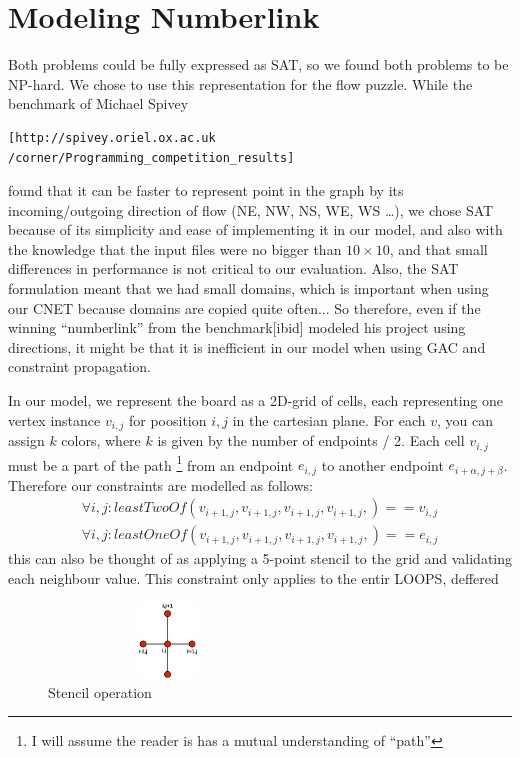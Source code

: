 \documentclass[journal]{IEEEtran}
\begin{document}
\section*{Modeling Numberlink}
Both problems could be fully expressed as SAT, so we found both problems to
be NP-hard. We chose to use this representation for the flow puzzle. 
While the benchmark of Michael Spivey 
\small\begin{verbatim}
[http://spivey.oriel.ox.ac.uk
/corner/Programming_competition_results]\end{verbatim}
\normalsize
found that it can be faster to represent point in the graph by its
incoming/outgoing direction of flow (NE, NW, NS, WE, WS \dots), 
we chose SAT because of its simplicity and ease of implementing it in our
model, and also with the knowledge that the input files were no bigger than
$10 \times 10$, and that small differences in performance is not critical to our evaluation.
Also, the SAT formulation meant that we had small domains, which is important
when using our CNET because domains are copied quite often... So therefore, 
even if the winning ``numberlink'' from the benchmark[ibid] modeled 
his project using directions, it might be that it is inefficient in 
our model when using GAC and constraint propagation.

In our model, we represent the board as a 2D-grid of cells, each representing one
vertex instance $v_{i,j}$ for poosition $i,j$ in the cartesian plane.
For each $v$, you can assign $k$ colors, where $k$ is given by
the number of endpoints / 2. 
Each cell $v_{i,j}$ must be a part of the path
\footnote{I will assume the reader is has a mutual understanding of ``path''}
from an endpoint $e_{i,j}$ to another endpoint $e_{i+\alpha,j+\beta}$.
Therefore our constraints are modelled as follows:
\begin{align}
    \forall{i,j}: leastTwoOf( v_{i+1,j},v_{i+1,j},v_{i+1,j},v_{i+1,j}, ) == v_{i,j} \\
    \forall{i,j}: leastOneOf( v_{i+1,j},v_{i+1,j},v_{i+1,j},v_{i+1,j}, ) == e_{i,j}
\end{align}
this can also be thought of as applying a 5-point stencil to the grid
and validating each neighbour value. This constraint only applies to the entir
LOOPS, deffered

\begin{figure}[Hb]
\centering
    \includegraphics[height=2cm,keepaspectratio,width=2.5in]{stencil.jpg}
\caption{Stencil operation}
\label{fig:stencil}
\end{figure}
\end{document}
